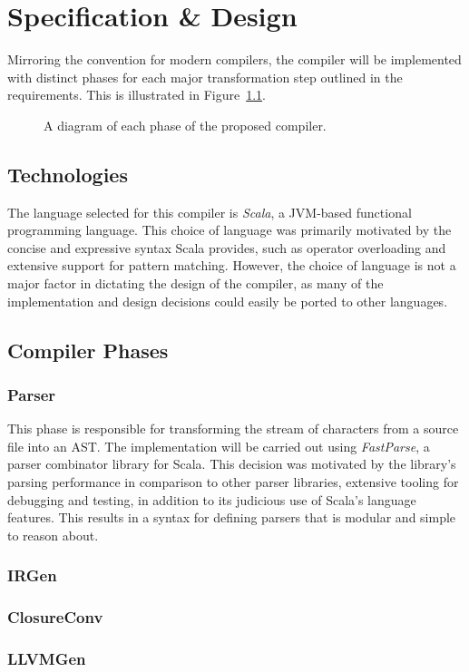 \chapter{Specification \& Design}

Mirroring the convention for modern compilers, the compiler will be implemented with distinct phases
for each major transformation step outlined in the requirements. This is illustrated in
Figure~\ref{fig:project-compiler-spec}.

\begin{figure}
    \centering
    
    \caption{A diagram of each phase of the proposed compiler.}
    \label{fig:project-compiler-spec}
\end{figure}

\section{Technologies}

The language selected for this compiler is \emph{Scala}, a JVM-based functional programming
language. This choice of language was primarily motivated by the concise and expressive syntax Scala
provides, such as operator overloading and extensive support for pattern matching. However, the
choice of language is not a major factor in dictating the design of the compiler, as many of the
implementation and design decisions could easily be ported to other languages.


\section{Compiler Phases}

\subsection{Parser}

This phase is responsible for transforming the stream of characters from a source file into an AST.
The implementation will be carried out using \emph{FastParse}, a parser combinator library for
Scala. This decision was motivated by the library's parsing performance in comparison to other
parser libraries, extensive tooling for debugging and testing, in addition to its judicious use of
Scala's language features. This results in a syntax for defining parsers that is modular and simple
to reason about.

\subsection{IRGen}

\subsection{ClosureConv}

\subsection{LLVMGen}
